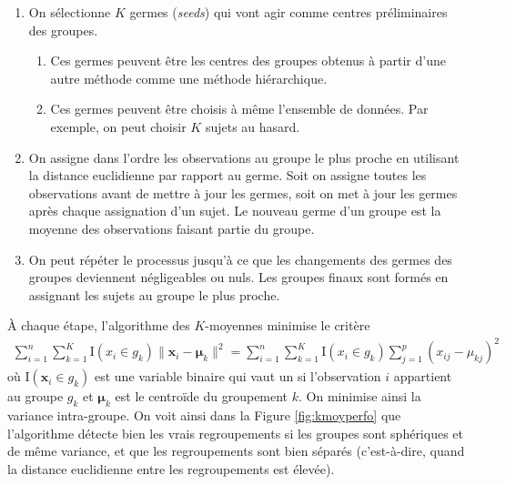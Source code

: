 \documentclass[
  11pt,
  letterpaper,
]{book}
\providecommand{\tightlist}{%
  \setlength{\itemsep}{0pt}\setlength{\parskip}{0pt}}
\theoremstyle{definition}
\theoremstyle{definition}
\theoremstyle{definition}
\theoremstyle{remark}
\begin{document}
\begin{enumerate}
\def\labelenumi{\arabic{enumi})}
\tightlist
\item
  On sélectionne \(K\) germes (\emph{seeds}) qui vont agir comme centres préliminaires des groupes.

  \begin{enumerate}
  \def\labelenumii{\roman{enumii})}
  \tightlist
  \item
    Ces germes peuvent être les centres des groupes obtenus à partir d'une autre méthode comme une méthode hiérarchique.
  \item
    Ces germes peuvent être choisis à même l'ensemble de données. Par exemple, on peut choisir \(K\) sujets au hasard.
  \end{enumerate}
\item
  On assigne dans l'ordre les observations au groupe le plus proche en utilisant la distance euclidienne par rapport au germe. Soit on assigne toutes les observations avant de mettre à jour les germes, soit on met à jour les germes après chaque assignation d'un sujet. Le nouveau germe d'un groupe est la moyenne des observations faisant partie du groupe.
\item
  On peut répéter le processus jusqu'à ce que les changements des germes des groupes deviennent négligeables ou nuls. Les groupes finaux sont formés en assignant les sujets au groupe le plus proche.
\end{enumerate}

À chaque étape, l'algorithme des \(K\)-moyennes minimise le critère
\begin{align*}
\sum_{i=1}^n \sum_{k=1}^K \mathrm{I}(x_i \in g_k)\|\boldsymbol{x}_i - \boldsymbol{\mu}_k\|^2 = \sum_{i=1}^n \sum_{k=1}^K \mathrm{I}(x_i \in g_k) \sum_{j=1}^p (x_{ij}-\mu_{kj})^2
\end{align*}
où \(\mathrm{I}(\boldsymbol{x}_i \in g_k)\) est une variable binaire qui vaut un si l'observation \(i\) appartient au groupe \(g_k\) et \(\boldsymbol{\mu}_k\) est le centroïde du groupement \(k\). On minimise ainsi la variance intra-groupe. On voit ainsi dans la Figure \ref{fig:kmoyperfo} que l'algorithme détecte bien les vrais regroupements si les groupes sont sphériques et de même variance, et que les regroupements sont bien séparés (c'est-à-dire, quand la distance euclidienne entre les regroupements est élevée).
\end{document}
